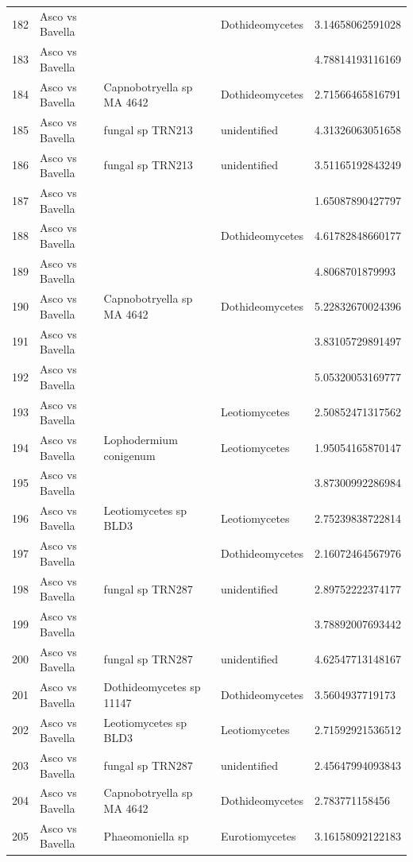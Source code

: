 \documentclass[12pt]{article}\usepackage[]{graphicx}\usepackage[]{color}
\numberwithin{figure}{section}
\begin{document}
\begin{table}[ht]
\begin{tabular}{lllll}
  182 & Asco vs Bavella &  & Dothideomycetes & 3.14658062591028 \\ 
  183 & Asco vs Bavella &  &  & 4.78814193116169 \\ 
  184 & Asco vs Bavella & Capnobotryella sp MA 4642 & Dothideomycetes & 2.71566465816791 \\ 
  185 & Asco vs Bavella & fungal sp TRN213 & unidentified & 4.31326063051658 \\ 
  186 & Asco vs Bavella & fungal sp TRN213 & unidentified & 3.51165192843249 \\ 
  187 & Asco vs Bavella &  &  & 1.65087890427797 \\ 
  188 & Asco vs Bavella &  & Dothideomycetes & 4.61782848660177 \\ 
  189 & Asco vs Bavella &  &  & 4.8068701879993 \\ 
  190 & Asco vs Bavella & Capnobotryella sp MA 4642 & Dothideomycetes & 5.22832670024396 \\ 
  191 & Asco vs Bavella &  &  & 3.83105729891497 \\ 
  192 & Asco vs Bavella &  &  & 5.05320053169777 \\ 
  193 & Asco vs Bavella &  & Leotiomycetes & 2.50852471317562 \\ 
  194 & Asco vs Bavella & Lophodermium conigenum & Leotiomycetes & 1.95054165870147 \\ 
  195 & Asco vs Bavella &  &  & 3.87300992286984 \\ 
  196 & Asco vs Bavella & Leotiomycetes sp BLD3 & Leotiomycetes & 2.75239838722814 \\ 
  197 & Asco vs Bavella &  & Dothideomycetes & 2.16072464567976 \\ 
  198 & Asco vs Bavella & fungal sp TRN287 & unidentified & 2.89752222374177 \\ 
  199 & Asco vs Bavella &  &  & 3.78892007693442 \\ 
  200 & Asco vs Bavella & fungal sp TRN287 & unidentified & 4.62547713148167 \\ 
  201 & Asco vs Bavella & Dothideomycetes sp 11147 & Dothideomycetes & 3.5604937719173 \\ 
  202 & Asco vs Bavella & Leotiomycetes sp BLD3 & Leotiomycetes & 2.71592921536512 \\ 
  203 & Asco vs Bavella & fungal sp TRN287 & unidentified & 2.45647994093843 \\ 
  204 & Asco vs Bavella & Capnobotryella sp MA 4642 & Dothideomycetes & 2.783771158456 \\ 
  205 & Asco vs Bavella & Phaeomoniella sp & Eurotiomycetes & 3.16158092122183 \\ 

\end{tabular}
\end{table}
\end{document}
